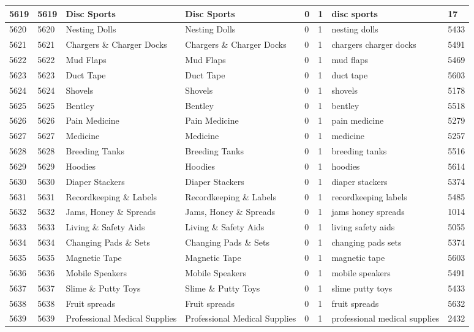 \begin{longtable}{|l|l|l|l|l|l|l|l|}
5619 & 5619 & Disc Sports & Disc Sports & 0 & 1 & disc sports & 17 \\ \hline 
5620 & 5620 & Nesting Dolls & Nesting Dolls & 0 & 1 & nesting dolls & 5433 \\ \hline 
5621 & 5621 & Chargers \& Charger Docks & Chargers \& Charger Docks & 0 & 1 & chargers charger docks & 5491 \\ \hline 
5622 & 5622 & Mud Flaps & Mud Flaps & 0 & 1 & mud flaps & 5469 \\ \hline 
5623 & 5623 & Duct Tape & Duct Tape & 0 & 1 & duct tape & 5603 \\ \hline 
5624 & 5624 & Shovels & Shovels & 0 & 1 & shovels & 5178 \\ \hline 
5625 & 5625 & Bentley & Bentley & 0 & 1 & bentley & 5518 \\ \hline 
5626 & 5626 & Pain Medicine & Pain Medicine & 0 & 1 & pain medicine & 5279 \\ \hline 
5627 & 5627 & Medicine & Medicine & 0 & 1 & medicine & 5257 \\ \hline 
5628 & 5628 & Breeding Tanks & Breeding Tanks & 0 & 1 & breeding tanks & 5516 \\ \hline 
5629 & 5629 & Hoodies & Hoodies & 0 & 1 & hoodies & 5614 \\ \hline 
5630 & 5630 & Diaper Stackers & Diaper Stackers & 0 & 1 & diaper stackers & 5374 \\ \hline 
5631 & 5631 & Recordkeeping \& Labels & Recordkeeping \& Labels & 0 & 1 & recordkeeping labels & 5485 \\ \hline 
5632 & 5632 & Jams, Honey \& Spreads & Jams, Honey \& Spreads & 0 & 1 & jams honey spreads & 1014 \\ \hline 
5633 & 5633 & Living \& Safety Aids & Living \& Safety Aids & 0 & 1 & living safety aids & 5055 \\ \hline 
5634 & 5634 & Changing Pads \& Sets & Changing Pads \& Sets & 0 & 1 & changing pads sets & 5374 \\ \hline 
5635 & 5635 & Magnetic Tape & Magnetic Tape & 0 & 1 & magnetic tape & 5603 \\ \hline 
5636 & 5636 & Mobile Speakers & Mobile Speakers & 0 & 1 & mobile speakers & 5491 \\ \hline 
5637 & 5637 & Slime \& Putty Toys & Slime \& Putty Toys & 0 & 1 & slime putty toys & 5433 \\ \hline 
5638 & 5638 & Fruit spreads & Fruit spreads & 0 & 1 & fruit spreads & 5632 \\ \hline 
5639 & 5639 & Professional Medical Supplies & Professional Medical Supplies & 0 & 1 & professional medical supplies & 2432 \\ \hline 

\end{longtable}
